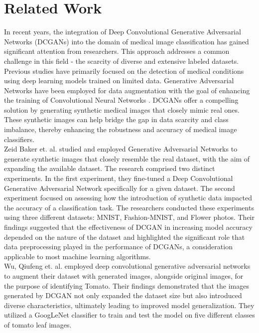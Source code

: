 \section{Related Work}
In recent years, the integration of Deep Convolutional Generative Adversarial Networks (DCGANs) into the domain of medical image classification has gained significant attention from researchers. This approach addresses a common challenge in this field - the scarcity of diverse and extensive labeled datasets. Previous studies have primarily focused on the detection of medical conditions using deep learning models trained on limited data. Generative Adversarial Networks have been employed for data augmentation with the goal of enhancing the training of Convolutional Neural Networks \cite{7}. DCGANs offer a compelling solution by generating synthetic medical images that closely mimic real ones. These synthetic images can help bridge the gap in data scarcity and class imbalance, thereby enhancing the robustness and accuracy of medical image classifiers.\\
Zeid Baker et. al.\cite{8} studied and employed Generative Adversarial Networks to generate synthetic images that closely resemble the real dataset, with the aim of expanding the available dataset. The research comprised two distinct experiments. In the first experiment, they fine-tuned a Deep Convolutional Generative Adversarial Network  specifically for a given dataset. The second experiment focused on assessing how the introduction of synthetic data impacted the accuracy of a classification task. The researchers conducted these experiments using three different datasets: MNIST, Fashion-MNIST, and Flower photos. Their findings suggested that the effectiveness of DCGAN in increasing model accuracy depended on the nature of the dataset and highlighted the significant role that data preprocessing played in the performance of DCGANs, a consideration applicable to most machine learning algorithms.\\ 
Wu, Qiufeng et. al. \cite{9}employed deep convolutional generative adversarial networks to augment their dataset with generated images, alongside original images, for the purpose of identifying Tomato. Their findings demonstrated that the images generated by DCGAN not only expanded the dataset size but also introduced diverse characteristics, ultimately leading to improved model generalization. They utilized a GoogLeNet classifier to train and test the model on five different classes of tomato leaf images.
